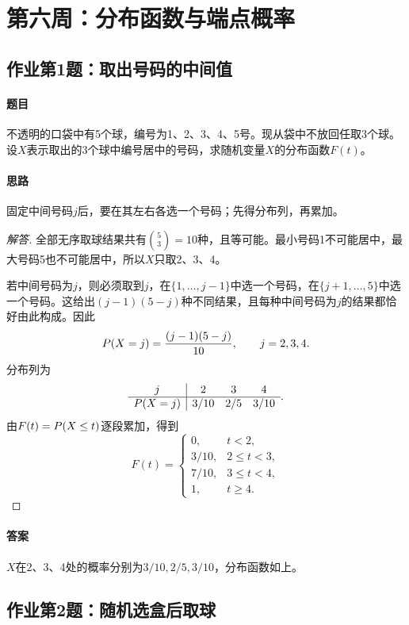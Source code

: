 \section{第六周：分布函数与端点概率}

\subsection{作业第1题：取出号码的中间值}
\label{ex:w06-h1}
\paragraph{题目}
不透明的口袋中有5个球，编号为1、2、3、4、5号。现从袋中不放回任取3个球。设$X$表示取出的3个球中编号居中的号码，求随机变量$X$的分布函数$F(t)$。
\paragraph{思路}固定中间号码$j$后，要在其左右各选一个号码；先得分布列，再累加。
\begin{proof}[解答]
全部无序取球结果共有$\binom53=10$种，且等可能。最小号码1不可能居中，最大号码5也不可能居中，所以$X$只取2、3、4。

若中间号码为$j$，则必须取到$j$，在$\{1,\ldots,j-1\}$中选一个号码，在$\{j+1,\ldots,5\}$中选一个号码。这给出$(j-1)(5-j)$种不同结果，且每种中间号码为$j$的结果都恰好由此构成。因此
\[
\P(X=j)=\frac{(j-1)(5-j)}{10},\qquad j=2,3,4.
\]
分布列为
\[
\begin{array}{c|ccc}
j&2&3&4\\\hline
\P(X=j)&3/10&2/5&3/10
\end{array}.
\]
由$F(t)=\P(X\leq t)$逐段累加，得到
\[
F(t)=\begin{cases}
0,&t<2,\\
3/10,&2\leq t<3,\\
7/10,&3\leq t<4,\\
1,&t\geq4.
\end{cases}
\]
\end{proof}
\paragraph{答案}$X$在2、3、4处的概率分别为$3/10,2/5,3/10$，分布函数如上。

\subsection{作业第2题：随机选盒后取球}
\label{ex:w06-h2}
